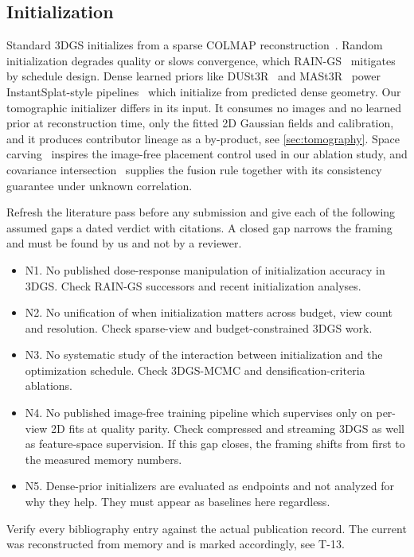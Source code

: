 \subsection{Initialization}
Standard 3DGS initializes from a sparse COLMAP
reconstruction~\citep{schoenberger2016_colmap}.  Random initialization degrades quality or
slows convergence, which RAIN-GS~\citep{jung2024_raings} mitigates by schedule design.
Dense learned priors like DUSt3R~\citep{wang2024_dust3r} and
MASt3R~\citep{leroy2024_mast3r} power InstantSplat-style
pipelines~\citep{fan2024_instantsplat} which initialize from predicted dense geometry.
Our tomographic initializer differs in its input.  It consumes no images and no learned
prior at reconstruction time, only the fitted 2D Gaussian fields and calibration, and it
produces contributor lineage as a by-product, see \cref{sec:tomography}.  Space
carving~\citep{kutulakos2000_carving} inspires the image-free placement control used in
our ablation study, and covariance intersection~\citep{julier1997_ci} supplies the fusion
rule together with its consistency guarantee under unknown correlation.

\begin{TodoBlock}
Refresh the literature pass before any submission and give each of the following assumed
gaps a dated verdict with citations.  A closed gap narrows the framing and must be found
by us and not by a reviewer.
\begin{itemize}[leftmargin=1.4em,itemsep=1pt]
  \item N1.  No published dose-response manipulation of initialization accuracy in 3DGS.
        Check RAIN-GS successors and recent initialization analyses.
  \item N2.  No unification of when initialization matters across budget, view count and
        resolution.  Check sparse-view and budget-constrained 3DGS work.
  \item N3.  No systematic study of the interaction between initialization and the
        optimization schedule.  Check 3DGS-MCMC and densification-criteria ablations.
  \item N4.  No published image-free training pipeline which supervises only on per-view
        2D fits at quality parity.  Check compressed and streaming 3DGS as well as
        feature-space supervision.  If this gap closes, the framing shifts from first to
        the measured memory numbers.
  \item N5.  Dense-prior initializers are evaluated as endpoints and not analyzed for why
        they help.  They must appear as baselines here regardless.
\end{itemize}
Verify every bibliography entry against the actual publication record.  The current
 was reconstructed from memory and is marked accordingly, see
T-13.
\end{TodoBlock}
